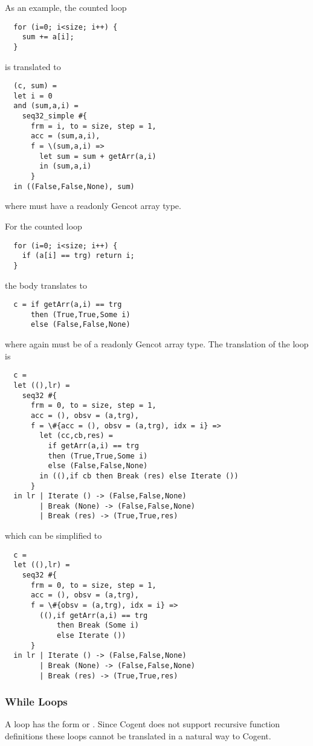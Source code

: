 As an example, the counted loop
\begin{verbatim}
  for (i=0; i<size; i++) { 
    sum += a[i];
  }
\end{verbatim}
is translated to
\begin{verbatim}
  (c, sum) = 
  let i = 0
  and (sum,a,i) = 
    seq32_simple #{
      frm = i, to = size, step = 1, 
      acc = (sum,a,i), 
      f = \(sum,a,i) => 
        let sum = sum + getArr(a,i)
        in (sum,a,i)
      }
  in ((False,False,None), sum)
\end{verbatim}
where  must have a readonly Gencot array type. 

For the counted loop
\begin{verbatim}
  for (i=0; i<size; i++) { 
    if (a[i] == trg) return i;
  }
\end{verbatim}
the body translates to 
\begin{verbatim}
  c = if getArr(a,i) == trg 
      then (True,True,Some i)
      else (False,False,None)
\end{verbatim}
where again  must be of a readonly Gencot array type. The translation of the loop is
\begin{verbatim}
  c = 
  let ((),lr) = 
    seq32 #{
      frm = 0, to = size, step = 1, 
      acc = (), obsv = (a,trg), 
      f = \#{acc = (), obsv = (a,trg), idx = i} => 
        let (cc,cb,res) =
          if getArr(a,i) == trg 
          then (True,True,Some i)
          else (False,False,None)
        in ((),if cb then Break (res) else Iterate ())
      }
  in lr | Iterate () -> (False,False,None)
        | Break (None) -> (False,False,None)
        | Break (res) -> (True,True,res)
\end{verbatim}
which can be simplified to
\begin{verbatim}
  c = 
  let ((),lr) = 
    seq32 #{
      frm = 0, to = size, step = 1, 
      acc = (), obsv = (a,trg), 
      f = \#{obsv = (a,trg), idx = i} => 
        ((),if getArr(a,i) == trg 
            then Break (Some i) 
            else Iterate ())
      }
  in lr | Iterate () -> (False,False,None)
        | Break (None) -> (False,False,None)
        | Break (res) -> (True,True,res)
\end{verbatim}

\subsubsection{While Loops}

A  loop has the form  or . Since Cogent does not support recursive 
function definitions these loops cannot be translated in a natural way to Cogent.

